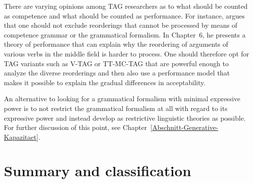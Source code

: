 There are varying opinions among TAG researchers as to what should be counted as competence and what
should be counted as performance. For instance, \citet[]{Rambow94a} argues that one should
not exclude reorderings that cannot be processed by means of competence grammar or the grammatical
formalism. In Chapter~6, he presents a theory of performance that can explain why the reordering of
arguments of various verbs in the middle field is harder to process.
One should therefore opt for TAG variants such as V-TAG or TT-MC-TAG \citep{Lichte2007a} that are powerful enough to analyze the diverse reorderings
	and then also use a performance model that makes it possible to explain the gradual differences in acceptability.

An alternative to looking for a grammatical formalism with minimal expressive power is to not restrict the grammatical formalism at all with regard
to its expressive power and instead develop as restrictive linguistic theories as possible. For further discussion of this point, see 
Chapter~\ref{Abschnitt-Generative-Kapazitaet}.

\section{Summary and classification}


